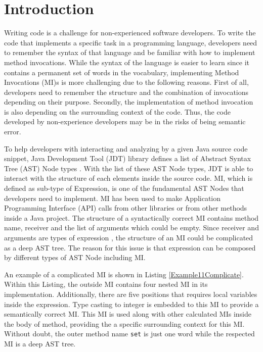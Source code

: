 \section{Introduction}
Writing code is a challenge for non-experienced software developers. To write the code that implements a specific task in a programming language, developers need to remember the syntax of that language and be familiar with how to implement method invocations. While the syntax of the language is easier to learn since it contains a permanent set of words in the vocabulary, implementing Method Invocations (MI)s is more challenging due to the following reasons. First of all, developers need to remember the structure and the combination of invocations depending on their purpose. Secondly, the implementation of method invocation is also depending on the surrounding context of the code. Thus, the code developed by non-experience developers may be in the risks of being semantic error.  

To help developers with interacting and analyzing by a given Java source code snippet, Java Development Tool (JDT) library defines a list of Abstract Syntax Tree (AST) Node types \cite{id:ASTDocumentation}. With the list of these AST Node types, JDT is able to interact with the structure of each elements inside the source code. MI, which is defined as sub-type of Expression, is one of the fundamental AST Nodes that developers need to implement. MI has been used to make Application Programming Interface (API) calls from other libraries or from other methods inside a Java project.  The structure of a syntactically correct MI contains method name, receiver and the list of arguments which could be empty. Since receiver and arguments are types of expression \cite{id:ASTDocumentation}, the structure of an MI could be complicated as a deep AST tree. The reason for this issue is that expression can be composed by different types of AST Node including MI. 

An example of a complicated MI is shown in Listing \ref{Example11Complicate}. Within this Listing, the outside MI contains four nested MI in its implementation. Additionally, there are five positions that requires local variables inside the expression. Type casting to integer is embedded to this MI to provide a semantically correct MI. This MI is used along with other calculated MIs inside the body of method, providing the a specific surrounding context for this MI. Without doubt, the outer method name \texttt{set} is just one word while the respected MI is a deep AST tree.


